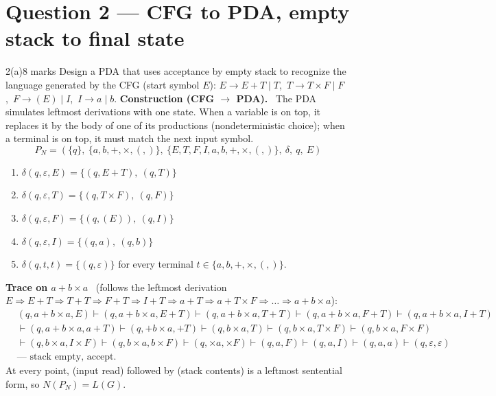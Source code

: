 \documentclass[10.5pt,a4paper]{article}
\newcommand{\ansh}[1]{\textbf{\color{exborder}#1}\ }
\newcommand{\eps}{\varepsilon}
\begin{document}
\section{Question 2 --- CFG to PDA, empty stack to final state}
\begin{qa}{2(a)}{8 marks}
Design a PDA that uses acceptance by empty stack to recognize the language generated by the CFG (start symbol $E$):
$E\to E+T\mid T$,\ $T\to T\times F\mid F$,\ $F\to(E)\mid I$,\ $I\to a\mid b$.
\tcblower
\ansh{Construction (CFG $\to$ PDA).} The PDA simulates leftmost derivations with one state. When a variable is on top, it replaces it by the
body of one of its productions (nondeterministic choice); when a terminal is on top, it must match the next input symbol.
\[P_N=(\{q\},\ \{a,b,+,\times,(,)\},\ \{E,T,F,I,a,b,+,\times,(,)\},\ \delta,\ q,\ E)\]
\begin{enumerate}
\item $\delta(q,\eps,E)=\{(q,E+T),\ (q,T)\}$
\item $\delta(q,\eps,T)=\{(q,T\times F),\ (q,F)\}$
\item $\delta(q,\eps,F)=\{(q,(E)),\ (q,I)\}$
\item $\delta(q,\eps,I)=\{(q,a),\ (q,b)\}$
\item $\delta(q,t,t)=\{(q,\eps)\}$ for every terminal $t\in\{a,b,+,\times,(,)\}$.
\end{enumerate}
\begin{center}
\end{center}
\ansh{Trace on $a+b\times a$} (follows the leftmost derivation $E\Rightarrow E+T\Rightarrow T+T\Rightarrow F+T\Rightarrow I+T\Rightarrow a+T\Rightarrow
a+T\times F\Rightarrow\dots\Rightarrow a+b\times a$):
\[\begin{aligned}
&(q,a{+}b{\times}a,E)\vdash(q,a{+}b{\times}a,E{+}T)\vdash(q,a{+}b{\times}a,T{+}T)\vdash(q,a{+}b{\times}a,F{+}T)\vdash(q,a{+}b{\times}a,I{+}T)\\
&\vdash(q,a{+}b{\times}a,a{+}T)\vdash(q,{+}b{\times}a,{+}T)\vdash(q,b{\times}a,T)\vdash(q,b{\times}a,T{\times}F)\vdash(q,b{\times}a,F{\times}F)\\
&\vdash(q,b{\times}a,I{\times}F)\vdash(q,b{\times}a,b{\times}F)\vdash(q,{\times}a,{\times}F)\vdash(q,a,F)\vdash(q,a,I)\vdash(q,a,a)\vdash(q,\eps,\eps)\\
&\text{--- stack empty, accept.}
\end{aligned}\]
At every point, (input read) followed by (stack contents) is a leftmost sentential form, so $N(P_N)=L(G)$.
\end{qa}
\end{document}
